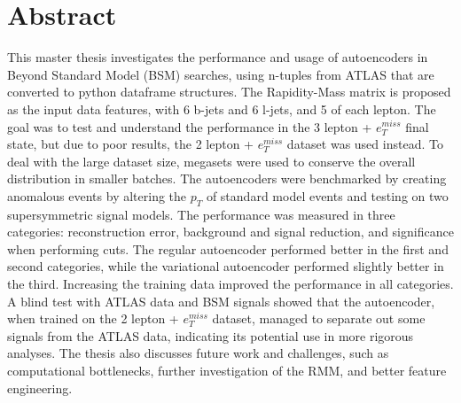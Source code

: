\chapter*{Abstract} 
This master thesis investigates the performance and usage of autoencoders in Beyond Standard Model (BSM) searches, 
using n-tuples from ATLAS that are converted to python dataframe structures. The Rapidity-Mass matrix is proposed 
as the input data features, with 6 b-jets and 6 l-jets, and 5 of each lepton. The goal was to test and understand 
the performance in the 3 lepton + $e_T^{miss}$ final state, but due to poor results, the 2 lepton + $e_T^{miss}$ 
dataset was used instead. To deal with the large dataset size, megasets were used to conserve the overall distribution 
in smaller batches. The autoencoders were benchmarked by creating anomalous events by altering the $p_T$ of standard 
model events and testing on two supersymmetric signal models. The performance was measured in three categories: 
reconstruction error, background and signal reduction, and significance when performing cuts. The regular 
autoencoder performed better in the first and second categories, while the variational autoencoder performed slightly 
better in the third. Increasing the training data improved the performance in all categories. A blind test 
with ATLAS data and BSM signals showed that the autoencoder, when trained on the 2 lepton + $e_T^{miss}$ dataset, 
managed to separate out some signals from the ATLAS data, indicating its potential use in more rigorous analyses. 
The thesis also discusses future work and challenges, such as computational bottlenecks, further investigation of 
the RMM, and better feature engineering.
